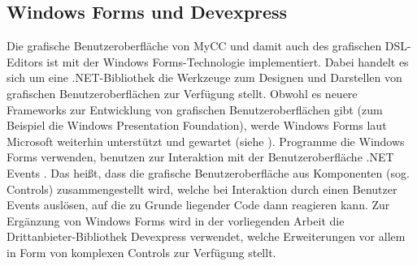 \subsection{Windows Forms und Devexpress}
Die grafische Benutzeroberfläche von MyCC und damit auch des grafischen DSL-Editors ist mit der Windows Forms-Technologie implementiert. Dabei handelt es sich um eine .NET-Bibliothek die Werkzeuge zum Designen und Darstellen von grafischen Benutzeroberflächen zur Verfügung stellt. Obwohl es neuere Frameworks zur Entwicklung von grafischen Benutzeroberflächen gibt (zum Beispiel die Windows Presentation Foundation), werde Windows Forms laut Microsoft weiterhin unterstützt und gewartet (siehe \cite{Allen:14}). Programme die Windows Forms verwenden, benutzen zur Interaktion mit der Benutzeroberfläche .NET Events \cite[S. 171ff]{Platt:03}. Das heißt, dass die grafische Benutzeroberfläche aus Komponenten (sog. Controls) zusammengestellt wird, welche bei Interaktion durch einen Benutzer Events auslösen, auf die zu Grunde liegender Code dann reagieren kann. Zur Ergänzung von Windows Forms wird in der vorliegenden Arbeit die Drittanbieter-Bibliothek Devexpress verwendet, welche Erweiterungen vor allem in Form von komplexen Controls zur Verfügung stellt. 